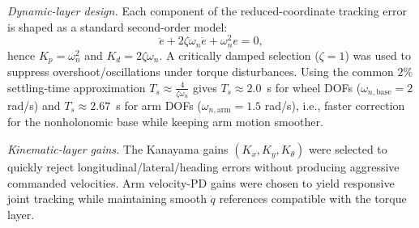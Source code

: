 \documentclass[conference]{IEEEtran}
\begin{document}
\begin{table}[t]
\centering
\caption{Gains used in the kinematic and dynamic control layers.}
\label{tab:gains}
\scriptsize
\setlength{\tabcolsep}{3.2pt}
\renewcommand{\arraystretch}{1.10}
\end{table}

\noindent\textit{Dynamic-layer design.}
Each component of the reduced-coordinate tracking error is shaped as a standard second-order model:
\[
\ddot e + 2\zeta\omega_n \dot e + \omega_n^2 e = 0,
\]
hence $K_p=\omega_n^2$ and $K_d=2\zeta\omega_n$. A critically damped selection ($\zeta=1$) was used to
suppress overshoot/oscillations under torque disturbances. Using the common $2\%$ settling-time approximation
$T_s \approx \frac{4}{\zeta\omega_n}$ gives $T_s\approx 2.0$~s for wheel DOFs
($\omega_{n,\mathrm{base}}=2$ rad/s) and $T_s\approx 2.67$~s for arm DOFs ($\omega_{n,\mathrm{arm}}=1.5$ rad/s),
i.e., faster correction for the nonholonomic base while keeping arm motion smoother.

\noindent\textit{Kinematic-layer gains.}
The Kanayama gains $(K_x,K_y,K_\theta)$ were selected to quickly reject longitudinal/lateral/heading errors
without producing aggressive commanded velocities. Arm velocity-PD gains were chosen to yield responsive joint
tracking while maintaining smooth $\dot q$ references compatible with the torque layer.
\end{document}
